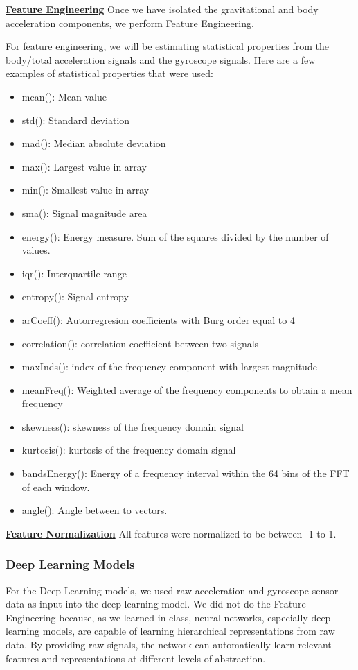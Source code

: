 \documentclass[conference]{IEEEtran}
\begin{document}
\textbf{\underline{Feature Engineering}} \newline 
Once we have isolated the gravitational and body acceleration components, we perform Feature Engineering. \newline 

For feature engineering, we will be estimating statistical properties from the body/total acceleration signals and the gyroscope signals. Here are a few examples of statistical properties that were used:
\begin{itemize}
    \item mean(): Mean value
    \item std(): Standard deviation
    \item mad(): Median absolute deviation 
    \item max(): Largest value in array
    \item min(): Smallest value in array
    \item sma(): Signal magnitude area
    \item energy(): Energy measure. Sum of the squares divided by the number of values. 
    \item iqr(): Interquartile range 
    \item entropy(): Signal entropy
    \item arCoeff(): Autorregresion coefficients with Burg order equal to 4
    \item correlation(): correlation coefficient between two signals
    \item maxInds(): index of the frequency component with largest magnitude
    \item meanFreq(): Weighted average of the frequency components to obtain a mean frequency
    \item skewness(): skewness of the frequency domain signal 
    \item kurtosis(): kurtosis of the frequency domain signal 
    \item bandsEnergy(): Energy of a frequency interval within the 64 bins of the FFT of each window.
    \item angle(): Angle between to vectors.
\end{itemize}

\textbf{\underline{Feature Normalization}} \newline 
All features were normalized to be between -1 to 1. \newline 

\subsubsection{Deep Learning Models}
For the Deep Learning models, we used raw acceleration and gyroscope sensor data as input into the deep learning model. We did not do the Feature Engineering because, as we learned in class, neural networks, especially deep learning models, are capable of learning hierarchical representations from raw data. By providing raw signals, the network can automatically learn relevant features and representations at different levels of abstraction.
\end{document}
